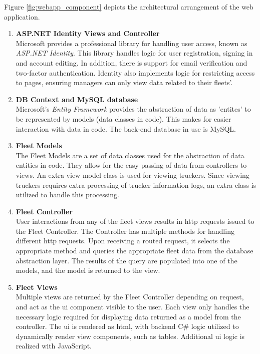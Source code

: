 Figure \ref{fig:webapp_component} depicts the architectural arrangement of the web application.
\begin{enumerate}
\item \textbf{ASP.NET Identity Views and Controller}\\
Microsoft provides a professional library for handling user access, known as \textit{ASP.NET Identity}.
This library handles logic for user registration, signing in and account editing.
In addition, there is support for email verification and two-factor authentication.
Identity also implements logic for restricting access to pages, ensuring managers can only view data related to their fleets'.

\item \textbf{DB Context and MySQL database}\\
Microsoft's \textit{Entity Framework} provides the abstraction of data as 'entites' to be represented by models (data classes in code).
This makes for easier interaction with data in code.
The back-end database in use is MySQL.

\item \textbf{Fleet Models}\\
The Fleet Models are a set of data classes used for the abstraction of data entities in code.
They allow for the easy passing of data from controllers to views.
An extra view model class is used for viewing truckers.
Since viewing truckers requires extra processing of trucker information logs, an extra class is utilized to handle this processing.

\item \textbf{Fleet Controller}\\
User interactions from any of the fleet views results in \ac{http} requests issued to the Fleet Controller.
The Controller has multiple methods for handling different \ac{http} requests.
Upon receiving a routed request, it selects the appropriate method and queries the appropriate fleet data from the database abstraction layer.
The results of the query are populated into one of the models, and the model is returned to the view.

\item \textbf{Fleet Views}\\
Multiple views are returned by the Fleet Controller depending on request, and act as the \ac{ui} component visible to the user.
Each view only handles the necessary logic required for displaying data returned as a model from the controller.
The \ac{ui} is rendered as \ac{html}, with backend C\# logic utilized to dynamically render view components, such as tables.
Additional \ac{ui} logic is realized with JavaScript.


\end{enumerate}
